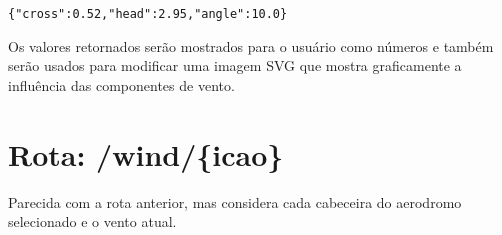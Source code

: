 \verb|{"cross":0.52,"head":2.95,"angle":10.0}|

Os valores retornados serão mostrados para o usuário como números e também serão
usados para modificar uma imagem SVG que mostra graficamente a influência das
componentes de vento.

\section{Rota: /wind/\{icao\}}
Parecida com a rota anterior, mas considera cada cabeceira do aerodromo selecionado
e o vento atual.



